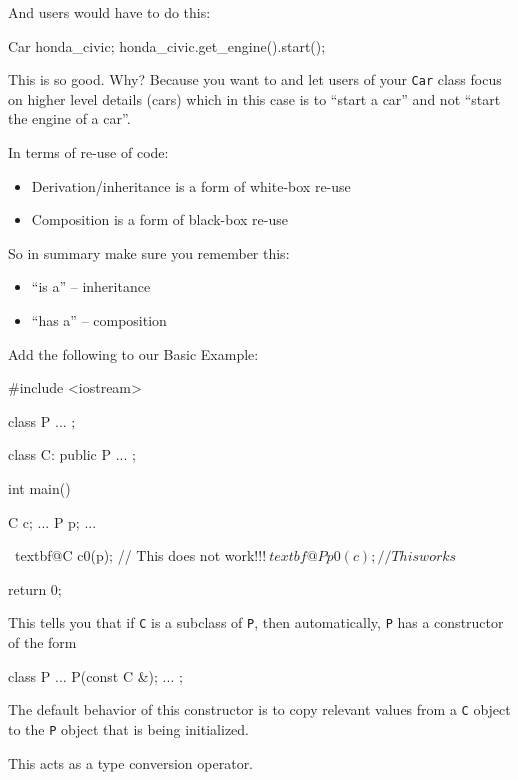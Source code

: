 And users would have to do this:
\begin{console}
Car honda_civic;
honda_civic.get_engine().start();
\end{console}

This is  so good. Why? Because you want to  and let users of your \verb!Car! class focus on higher level details (cars) which in this case is to ``start a car'' and not ``start the engine of a car''.

In terms of re-use of code:
\begin{itemize}
\item
  Derivation/inheritance is a form of white-box re-use
\item
  Composition is a form of black-box re-use
\end{itemize}

So in summary make sure you remember this:
\begin{itemize}
\item
  ``is a'' -- inheritance
\item
  ``has a'' -- composition
\end{itemize}

\newpage{}

Add the following to our Basic Example:
\begin{console}[commandchars=\~\@\$]
#include <iostream>

class P
{     
      ...
};

class C: public P
{
        ...
};

int main()
{   
    C c;
    ...
    P p;
    ...
    
    ~textbf@C c0(p); // This does not work!!!$
    ~textbf@P p0(c); // This works$

    return 0;
}
\end{console}

This tells you that if \verb!C! is a subclass of \verb!P!, then automatically, \verb!P! has a constructor of the form
\begin{console}
class P
{     
      ...
      P(const C &);
      ...
};
\end{console}

The default behavior of this constructor is to copy relevant values from
a \verb!C! object to the \verb!P! object that is being initialized.

This acts as a type conversion operator.

